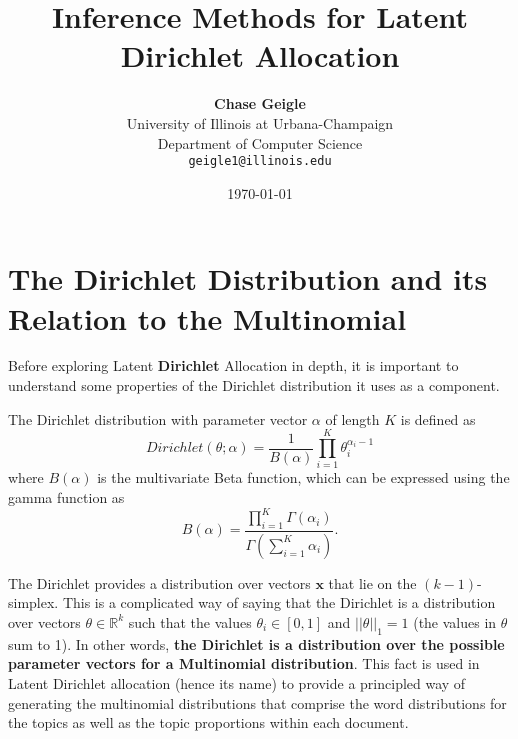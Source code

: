 \documentclass[11pt]{article}
\begin{document}
\onehalfspacing
\title{Inference Methods for Latent Dirichlet Allocation}
\date{\today}
\author{%
    \Large{\textbf{Chase Geigle}}\\
    University of Illinois at Urbana-Champaign\\
    Department of Computer Science\\
    \texttt{geigle1@illinois.edu}
}
\maketitle


\section{The Dirichlet Distribution and its Relation to the Multinomial}

Before exploring Latent \textbf{Dirichlet} Allocation in depth, it is
important to understand some properties of the Dirichlet distribution it
uses as a component.

The Dirichlet distribution with parameter vector $\alpha$ of length $K$ is
defined as
\begin{equation}
  Dirichlet(\theta; \alpha) = \frac{1}{B(\alpha)} \prod_{i=1}^K
  \theta_i^{\alpha_i - 1}
  \label{eqn:dirichlet-pdf}
\end{equation}
where $B(\alpha)$ is the multivariate Beta function, which can be expressed
using the gamma function as
\begin{equation}
  B(\alpha) = \frac{\prod_{i=1}^K
  \Gamma(\alpha_i)}{\Gamma\left(\sum_{i=1}^K \alpha_i\right)}.
\end{equation}

The Dirichlet provides a distribution over vectors $\mathbf{x}$ that lie on
the $(k-1)$-simplex. This is a complicated way of saying that the Dirichlet
is a distribution over vectors $\theta \in \mathbb{R}^k$ such that the
values $\theta_i \in [0,1]$ and $||\theta||_1 = 1$ (the values in $\theta$
sum to 1). In other words, \textbf{the Dirichlet is a distribution over the
possible parameter vectors for a Multinomial distribution}. This fact is
used in Latent Dirichlet allocation (hence its name) to provide a
principled way of generating the multinomial distributions that comprise
the word distributions for the topics as well as the topic proportions
within each document.
\end{document}
